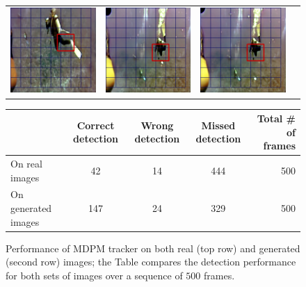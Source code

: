 \documentclass[letterpaper, 10pt, conference]{ieeeconf}
\begin{document}
\begin{figure}
\begin{tabular}{p{4.0cm} p{4.0cm} p{4.0cm} p{4.0cm}}
   \includegraphics[width=1.7in]{mdpm/gen2} &
   \includegraphics[width=1.7in]{mdpm/gen3} &
   \includegraphics[width=1.7in]{mdpm/gen4} \\
\end{tabular}
\label{fig:mdpm}
\vspace{4mm}

\begin{tabular}{l|c|c|c|r|}
 \cline{2-5}
 &  Correct detection & Wrong detection & Missed detection & Total \# of frames\\ \hline  \cline{2-4}
On real images  &  42 & 14 & 444 & 500  \\ \hline
On generated images  &  147 & 24 & 329 & 500  \\ \hline
\end{tabular}

\caption{Performance of MDPM tracker \cite{islam2017mixed} on both real (top row) and generated (second row) images; the Table compares the detection performance for both sets of images over a sequence of $500$ frames.   }
\label{mdpmStuff}
\end{figure}


\end{document}
